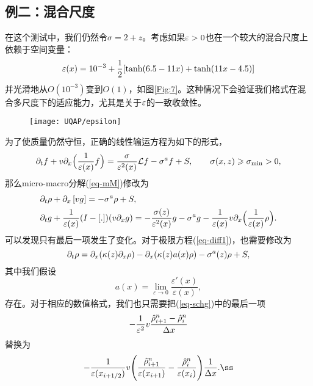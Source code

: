 \subsection{例二：混合尺度}
在这个测试中，我们仍然令$\sigma = 2 + z$。考虑如果$\varepsilon>0$也在一个较大的混合尺度上依赖于空间变量：
\begin{equation}
\varepsilon(x)=10^{-3}+\frac{1}{2}[\tanh(6.5-11x)+\tanh(11x-4.5)]
\end{equation}
并光滑地从$O(10^{-3})$变到$O(1)$，如图\ref{Fig:7}。这种情况下会验证我们格式在混合多尺度下的适应能力，尤其是关于$\varepsilon$的一致收敛性。
\begin{figure}[htbp]
  \centering
  \texttt{[image: UQAP/epsilon]}
\end{figure}

为了使质量仍然守恒，正确的线性输运方程为如下的形式，
\begin{equation}
  \partial_t f + v \partial_x\Big(\frac{1}{\varepsilon(x)} f\Big) = \frac{\sigma}{\varepsilon^2(x)}{\cal L} f - \sigma^a f + S, \qquad \sigma(x, z) \geqslant \sigma_{\text{min}} > 0,
\end{equation}
那么micro-macro分解(\ref{eq-mM})修改为
\begin{subequations}
  \begin{align}
    & \partial_t \rho + \partial_x\left[ vg \right] = -\sigma^a \rho + S ,  \\
    & \partial_t g + \frac{1}{\varepsilon(x)} (I-\left[ . \right]) (v\partial_x g) = -\frac{\sigma(z)}{\varepsilon^2(x)}g  - \sigma^a g - \frac{1}{\varepsilon(x)}v \partial_x\Big(\frac{1}{\varepsilon(x)}\rho\Big).
  \end{align}
\end{subequations}
可以发现只有最后一项发生了变化。对于极限方程(\ref{eq-diff1})，也需要修改为
\begin{equation}
  \partial_t \rho =  \partial_{x} (\kappa(z)  \partial_{x}\rho) - \partial_x(\kappa(z)a(x)\rho)-\sigma^a(z) \rho +S,
\end{equation}
其中我们假设
\begin{equation}
  a(x) =\lim\limits_{\varepsilon\rightarrow 0}\frac{\varepsilon'(x)}{\varepsilon(x)},
\end{equation}
存在。对于相应的数值格式，我们也只需要把(\ref{eq-schg})中的最后一项
\begin{equation}
  -\frac{1}{\varepsilon^2}v\frac{\hat{\rho}^n_{i+1}-\hat{\rho}^n_{i}}{\Delta x}
\end{equation}
替换为
\begin{equation}
   -\frac{1}{\eps(x_{i+1/2})}v\Bigg(\frac{\hrhonip}{\eps(x_{i+1})}-\frac{\hrhoni}{\eps(x_i)}\Bigg)\frac{1}{\Dx}.ß
\end{equation}

